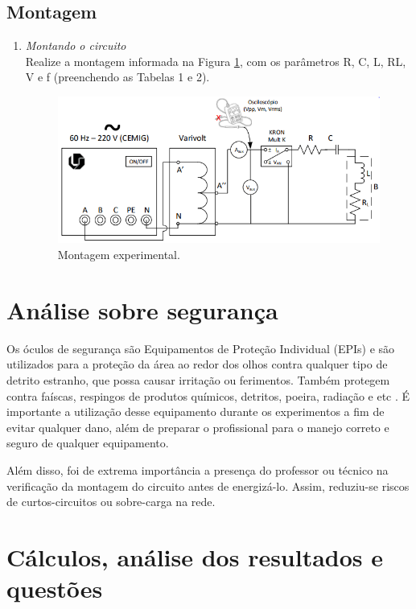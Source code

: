 \documentclass[a4paper,12pt,oneside,openany,table,xcdraw]{article}
\begin{document}
\subsection{Montagem} %

\begin{enumerate}[1)]
\item \emph{Montando o circuito}\\
Realize a montagem informada na Figura \ref{fig1}, com os parâmetros R, C, L, RL, V e f (preenchendo as
Tabelas 1 e 2). 

\begin{figure}[H]
\centering
\captionsetup{font=scriptsize}
\includegraphics[width=11cm]{fig1}
\caption{Montagem experimental.}
\label{fig1}
\end{figure}

\end{enumerate}

\section{Análise sobre segurança} %
Os óculos de segurança são Equipamentos de Proteção Individual (EPIs) e são utilizados para a proteção da área ao redor dos olhos contra qualquer tipo de detrito estranho, que possa causar irritação ou ferimentos. Também protegem contra faíscas, respingos de produtos químicos, detritos, poeira, radiação e etc \cite{safe}.
É importante a utilização desse equipamento durante os experimentos a fim de evitar qualquer dano, além de preparar o profissional para o manejo correto e seguro de qualquer equipamento.

Além disso, foi de extrema importância a presença do professor ou técnico na verificação da montagem do circuito antes de energizá-lo. Assim, reduziu-se riscos de curtos-circuitos ou sobre-carga na rede.

\section{Cálculos, análise dos resultados e questões} %
\end{document}
